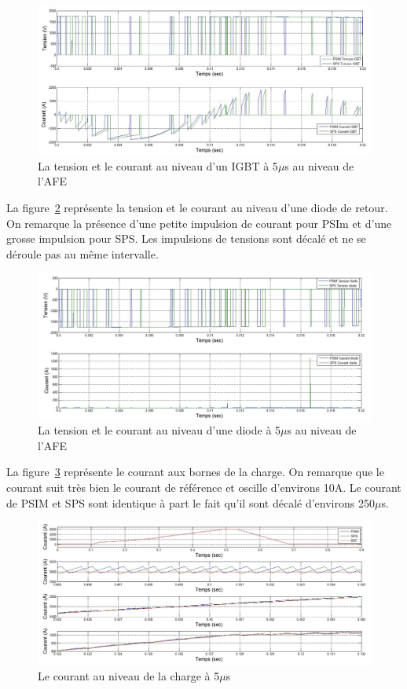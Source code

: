 \documentclass[11pt,letterpaper,final]{report}
\begin{document}
\begin{figure}[htb]
\centering
\includegraphics[scale=0.5]{Fig/DCP_AFE/5u/IGBT_afe.jpg}
\caption{La tension et le courant au niveau d'un IGBT à 5$\mu$s au niveau de l'AFE}
\label{AF_DC_IGBT5}
\end{figure}

La figure~\ref{AF_DC_DI5} représente la tension et le courant au niveau d'une diode de retour. On remarque la présence d'une petite impulsion de courant pour PSIm et d'une grosse impulsion pour SPS. Les impulsions de tensions sont décalé et ne se déroule pas au même intervalle.

\begin{figure}[htb]
\centering
\includegraphics[scale=0.5]{Fig/DCP_AFE/5u/ten_diode_afe.jpg}
\caption{La tension et le courant au niveau d'une diode à 5$\mu$s au niveau de l'AFE}
\label{AF_DC_DI5}
\end{figure}

La figure~\ref{AF_DC_CHA5} représente le courant aux bornes de la charge. On remarque que le courant suit très bien le courant de référence et oscille d'environs 10A. Le courant de PSIM et SPS sont identique à part le fait qu'il sont décalé d'environs 250$\mu$s.

\begin{figure}[htb]
\centering
\includegraphics[scale=0.5]{Fig/DCP_AFE/5u/cour_ch.jpg}
\caption{Le courant au niveau de la charge à 5$\mu$s}
\label{AF_DC_CHA5}
\end{figure}
\end{document}
